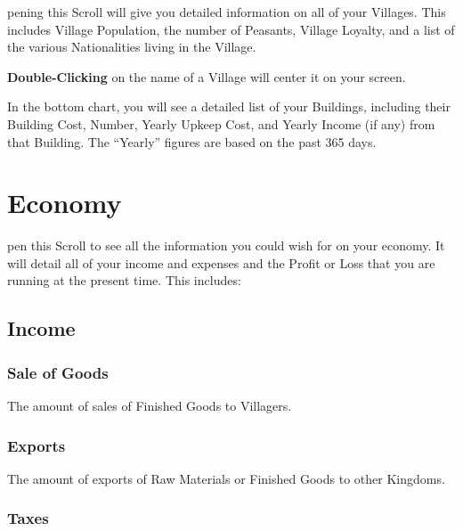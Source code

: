 
pening this Scroll will give you detailed information on all of your Villages. This includes Village Population, the number of Peasants, Village Loyalty, and a list of the various Nationalities living in the Village.

\textbf{Double-Clicking} on the name of a Village will center it on your screen.


In the bottom chart, you will see a detailed list of your Buildings, including their Building Cost, Number, Yearly Upkeep Cost, and Yearly Income (if any) from that Building. The “Yearly” figures are based on the past 365 days.

\section{\textsf{Economy}}


pen this Scroll to see all the information you could wish for on your economy. It will detail all of your income and expenses and the Profit or Loss that you are running at the present time. This includes:

\subsection{\textsf{Income}}



\subsubsection{\textsf{Sale of Goods}}

The amount of sales of Finished Goods to Villagers.

\subsubsection{\textsf{Exports}}

The amount of exports of Raw Materials or Finished Goods to other Kingdoms.

\subsubsection{\textsf{Taxes}}

